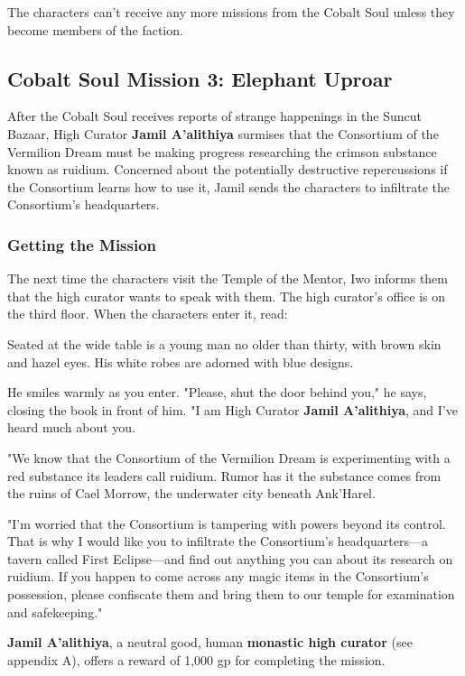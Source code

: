 \documentclass[10pt,a4paper,twoside,fancy,bg=print,twocolumn,openany,nodeprecatedcode]{dndbook}
\begin{document}
The characters can't receive any more missions from the Cobalt Soul unless they become members of the faction.

\subsection{Cobalt Soul Mission 3: Elephant Uproar}
After the Cobalt Soul receives reports of strange happenings in the Suncut Bazaar, High Curator \textbf{Jamil A'alithiya} surmises that the Consortium of the Vermilion Dream must be making progress researching the crimson substance known as ruidium. Concerned about the potentially destructive repercussions if the Consortium learns how to use it, Jamil sends the characters to infiltrate the Consortium's headquarters.

\subsubsection{Getting the Mission}
The next time the characters visit the Temple of the Mentor, Iwo informs them that the high curator wants to speak with them. The high curator's office is on the third floor. When the characters enter it, read:

\begin{DndReadAloud}{}
Seated at the wide table is a young man no older than thirty, with brown skin and hazel eyes. His white robes are adorned with blue designs.

He smiles warmly as you enter. "Please, shut the door behind you," he says, closing the book in front of him. "I am High Curator \textbf{Jamil A'alithiya}, and I've heard much about you.

"We know that the Consortium of the Vermilion Dream is experimenting with a red substance its leaders call ruidium. Rumor has it the substance comes from the ruins of Cael Morrow, the underwater city beneath Ank'Harel.

"I'm worried that the Consortium is tampering with powers beyond its control. That is why I would like you to infiltrate the Consortium's headquarters—a tavern called First Eclipse—and find out anything you can about its research on ruidium. If you happen to come across any magic items in the Consortium's possession, please confiscate them and bring them to our temple for examination and safekeeping."

\end{DndReadAloud}

\textbf{Jamil A'alithiya}, a neutral good, human \textbf{monastic high curator} (see appendix A), offers a reward of 1,000 gp for completing the mission.
\end{document}
